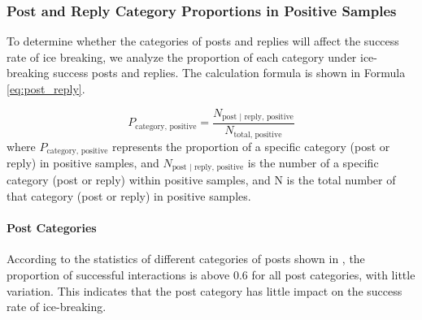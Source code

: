 
\subsubsection{Post and Reply Category Proportions in Positive Samples}
To determine whether the categories of posts and replies will affect the success rate of ice breaking, we analyze the proportion of each category under ice-breaking success posts and replies. The calculation formula is shown in Formula \ref{eq:post_reply}.

\begin{equation}
    P_{\text{category, positive}} = \frac{N_{\text{post~|~reply, positive}}}{N_{\text{total, positive}}}
    \label{eq:post_reply}
\end{equation}
\noindent
where $P_{\text{category, positive}}$ represents the proportion of a specific category (post or reply) in positive samples, and $N_{\text{post | reply, positive}}$ is the number of a specific category (post or reply) within positive samples, and N{} is the total number of that category (post or reply) in positive samples.

\paragraph{Post Categories}
 According to the statistics of different categories of posts shown in , the proportion of successful interactions is above 0.6 for all post categories, with little variation. This indicates that the post category has little impact on the success rate of ice-breaking.

